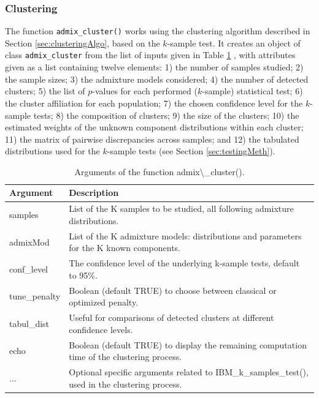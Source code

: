 \subsubsection{Clustering}\label{clustering}

The function \texttt{admix\_cluster()} works using the clustering algorithm described in Section \ref{sec:clusteringAlgo}, based on the \(k\)-sample test. It creates an object of class \texttt{admix\_cluster} from the list of inputs given in Table \ref{tab:admixClusterArgs-latex} , with attributes given as a list containing twelve elements: 1) the number of samples studied; 2) the sample sizes; 3) the admixture models considered; 4) the number of detected clusters; 5) the list of \(p\)-values for each performed (\(k\)-sample) statistical test; 6) the cluster affiliation for each population; 7) the chosen confidence level for the \(k\)-sample tests; 8) the composition of clusters; 9) the size of the clusters; 10) the estimated weights of the unknown component distributions within each cluster; 11) the matrix of pairwise discrepancies across samples; and 12) the tabulated distributions used for the \(k\)-sample tests (see Section \ref{sec:testingMeth}).

\begin{table}[!h]
\centering
\caption{\label{tab:admixClusterArgs-latex}Arguments of the function admix\textbackslash{}\_cluster().}
\centering
\fontsize{8}{10}\selectfont
\begin{tabular}[t]{ll}
\toprule
Argument & Description\\
\midrule
samples & List of the K samples to be studied, all following admixture distributions.\\
admixMod & List of the K admixture models: distributions and parameters for the K known components.\\
conf\_level & The confidence level of the underlying k-sample tests, default to 95\%.\\
tune\_penalty & Boolean (default TRUE) to choose between classical or optimized penalty.\\
tabul\_dist & Useful for comparisons of detected clusters at different confidence levels.\\
echo & Boolean (default TRUE) to display the remaining computation time of the clustering process.\\
... & Optional specific arguments related to IBM\_k\_samples\_test(), used in the clustering process.\\
\bottomrule
\end{tabular}
\end{table}

